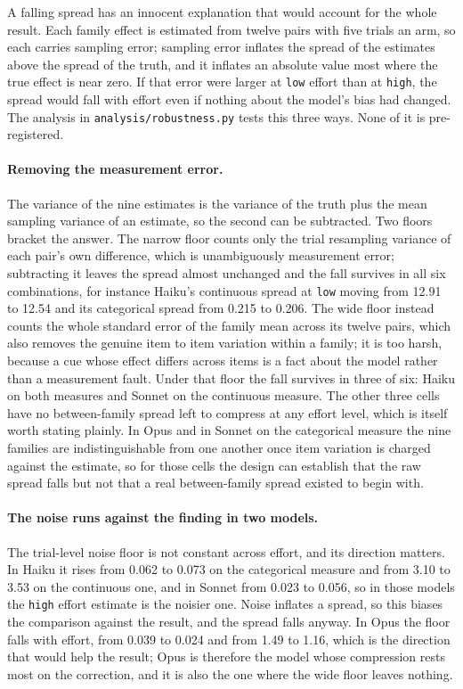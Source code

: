 \label{sec:rtm}\label{app:rtm}
A falling spread has an innocent explanation that would account for the whole
result. Each family effect is estimated from twelve pairs with five trials an
arm, so each carries sampling error; sampling error inflates the spread of
the estimates above the spread of the truth, and it inflates an absolute
value most where the true effect is near zero. If that error were larger at
\texttt{low} effort than at \texttt{high}, the spread would fall with effort
even if nothing about the model's bias had changed. The analysis in
\texttt{analysis/robustness.py} tests this three ways. None of it is
pre-registered.

\paragraph{Removing the measurement error.} The variance of the nine
estimates is the variance of the truth plus the mean sampling variance of an
estimate, so the second can be subtracted. Two floors bracket the answer.
The narrow floor counts only the trial resampling variance of each pair's own
difference, which is unambiguously measurement error; subtracting it leaves
the spread almost unchanged and the fall survives in all six combinations,
for instance Haiku's continuous spread at \texttt{low} moving from 12.91 to
12.54 and its categorical spread from 0.215 to 0.206. The wide floor instead
counts the whole standard error of the family mean across its twelve pairs,
which also removes the genuine item to item variation within a family; it is
too harsh, because a cue whose effect differs across items is a fact about
the model rather than a measurement fault. Under that floor the fall survives
in three of six: Haiku on both measures and Sonnet on the continuous measure.
The other three cells have no between-family spread left to compress at any
effort level, which is itself worth stating plainly. In Opus and in Sonnet on
the categorical measure the nine families are indistinguishable from one
another once item variation is charged against the estimate, so for those
cells the design can establish that the raw spread falls but not that a real
between-family spread existed to begin with.

\paragraph{The noise runs against the finding in two models.} The trial-level
noise floor is not constant across effort, and its direction matters. In
Haiku it rises from 0.062 to 0.073 on the categorical measure and from 3.10
to 3.53 on the continuous one, and in Sonnet from 0.023 to 0.056, so in those
models the \texttt{high} effort estimate is the noisier one. Noise inflates a
spread, so this biases the comparison against the result, and the spread
falls anyway. In Opus the floor falls with effort, from 0.039 to 0.024 and
from 1.49 to 1.16, which is the direction that would help the result; Opus is
therefore the model whose compression rests most on the correction, and it is
also the one where the wide floor leaves nothing.


